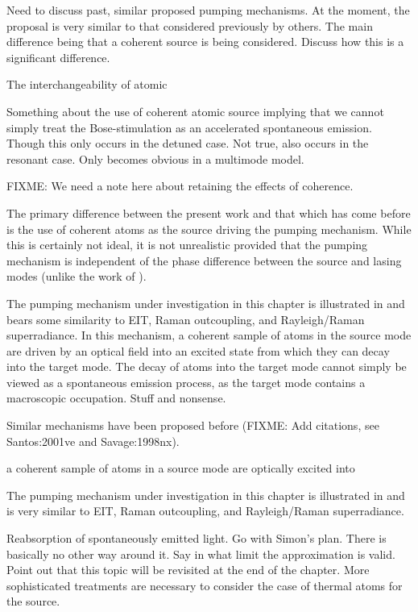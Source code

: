 Need to discuss past, similar proposed pumping mechanisms.  At the moment, the proposal is very similar to that considered previously by others.  The main difference being that a coherent source is being considered.  Discuss how this is a significant difference.



The interchangeability of atomic 


Something about the use of coherent atomic source implying that we cannot simply treat the Bose-stimulation as an accelerated spontaneous emission.  Though this only occurs in the detuned case.  Not true, also occurs in the resonant case. Only becomes obvious in a multimode model.

FIXME:  We need a note here about retaining the effects of coherence.



The primary difference between the present work and that which has come before is the use of coherent atoms as the source driving the pumping mechanism.  While this is certainly not ideal, it is not unrealistic provided that the pumping mechanism is independent of the phase difference between the source and lasing modes (unlike the work of \citep{Savage:1998nx}).




The pumping mechanism under investigation in this chapter is illustrated in  and bears some similarity to EIT, Raman outcoupling, and Rayleigh/Raman superradiance.  In this mechanism, a coherent sample of atoms in the source mode are driven by an optical field into an excited state from which they can decay into the target mode.  The decay of atoms into the target mode cannot simply be viewed as a spontaneous emission process, as the target mode contains a macroscopic occupation.  Stuff and nonsense.


Similar mechanisms have been proposed before (FIXME: Add citations, see Santos:2001ve and Savage:1998nx).

a coherent sample of atoms in a source mode are optically excited into 


The pumping mechanism under investigation in this chapter is illustrated in  and is very similar to EIT, Raman outcoupling, and Rayleigh/Raman superradiance.  


Reabsorption of spontaneously emitted light.  Go with Simon's plan.  There is basically no other way around it.  Say in what limit the approximation is valid.  Point out that this topic will be revisited at the end of the chapter.  More sophisticated treatments are necessary to consider the case of thermal atoms for the source. 


